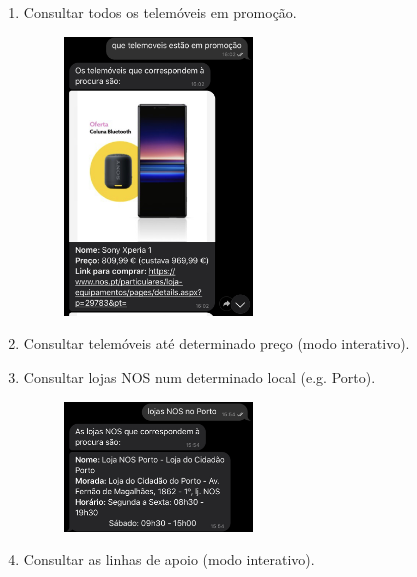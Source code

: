 \documentclass[11pt, a4paper]{article}
\begin{document}
\begin{appendices}
\begin{enumerate}
\begin{figure}[H]
    \end{figure}
    \item Consultar todos os telemóveis em promoção.
    \begin{figure}[H]
        \centering
        \includegraphics[width=5cm]{images/guiaoR/10.jpg}
    \end{figure}
    \item Consultar telemóveis até determinado preço (modo interativo).
    \item Consultar lojas NOS num determinado local (e.g. Porto).
    \begin{figure}[H]
        \centering
        \includegraphics[width=5cm]{images/guiaoR/12.jpg}
    \end{figure}
    \item Consultar as linhas de apoio (modo interativo).
    \begin{figure}[H]
        \centering

\end{figure}
\end{enumerate}
\end{appendices}
\end{document}
